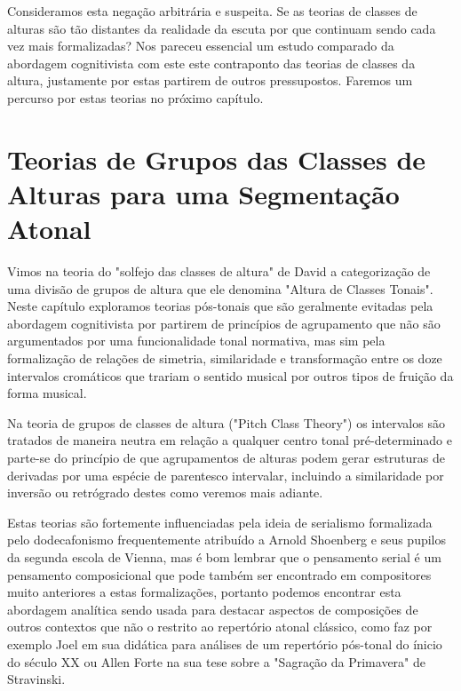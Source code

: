 \documentclass[
	12pt,				%
	openright,			%
	twoside,			%
	a4paper,			%
	english,			%
	french,				%
	spanish,			%
	brazil				%
	]{abntex2}
\begin{document}
Consideramos esta negação arbitrária e suspeita. Se as teorias de classes de alturas são tão distantes da realidade da escuta por que continuam sendo cada vez mais formalizadas? Nos pareceu essencial um estudo comparado da abordagem cognitivista com este este contraponto das teorias de classes da altura, justamente por estas partirem de outros pressupostos. Faremos um percurso por estas teorias no próximo capítulo.


\chapter{Teorias de Grupos das Classes de Alturas para uma Segmentação Atonal }
\label{modelos}

Vimos na teoria do "solfejo das classes de altura"\cite[p. 115]{temperley2004cognition} de David  a categorização de uma divisão de grupos de altura que ele denomina "Altura de Classes Tonais"\cite[p. 115]{temperley2004cognition}. Neste capítulo exploramos teorias pós-tonais que são geralmente evitadas pela abordagem cognitivista por partirem de princípios de agrupamento que não são argumentados por uma funcionalidade tonal normativa, mas sim pela formalização de relações de simetria, similaridade e transformação entre os doze intervalos cromáticos que trariam o sentido musical por outros tipos de fruição da forma musical. 

Na teoria de grupos de classes de altura ("Pitch Class Theory") os intervalos são tratados de maneira neutra em relação a qualquer centro tonal pré-determinado e parte-se do princípio de que agrupamentos de alturas podem gerar estruturas de derivadas por uma espécie de parentesco intervalar, incluindo a similaridade por inversão ou retrógrado destes como veremos mais adiante. 

Estas teorias são fortemente influenciadas pela ideia de serialismo formalizada pelo dodecafonismo frequentemente atribuído a Arnold Shoenberg e seus pupilos da segunda escola de Vienna, mas é bom lembrar que o pensamento serial é um pensamento composicional que pode também ser encontrado em compositores muito anteriores a estas formalizações, portanto podemos encontrar esta abordagem analítica sendo usada para destacar aspectos de composições de outros contextos que não o restrito ao repertório atonal clássico, como faz por exemplo Joel  em sua didática para análises de um repertório pós-tonal do ínicio do século XX ou Allen Forte na sua tese sobre a "Sagração da Primavera" de Stravinski\cite{forte1978harmonic}.
\end{document}
